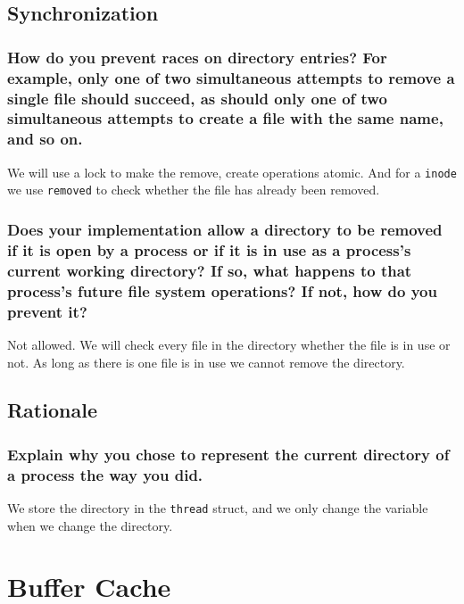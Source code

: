 \documentclass[sigconf, nonacm, balance=false, urlbreakonhyphens=true]{acmart}
\begin{document}
        
        \subsection{Synchronization}

            \subsubsection{How do you prevent races on directory entries?  For example, only one of two simultaneous attempts to remove a single file should succeed, as should only one of two simultaneous attempts to create a file with the same name, and so on. } 

	            We will use a lock to make the remove, create operations atomic. And for a \texttt{inode} we  use \texttt{removed} to check whether the file has already been removed.


            \subsubsection{Does your implementation allow a directory to be removed if it is open by a process or if it is in use as a process's current working directory?  If so, what happens to that process's future file system operations?  If not, how do you prevent it? }
        
                Not allowed. We will check every file in the directory whether the file is in use or not. As long as there is one file is in use we cannot remove the directory.

        \subsection{Rationale}

            \subsubsection{Explain why you chose to represent the current directory of a process the way you did. }

                We store the directory in the \texttt{thread} struct, and  we only change the variable when we change the directory.

    \section{Buffer Cache}

        \label{Buffer Cache}
\end{document}
